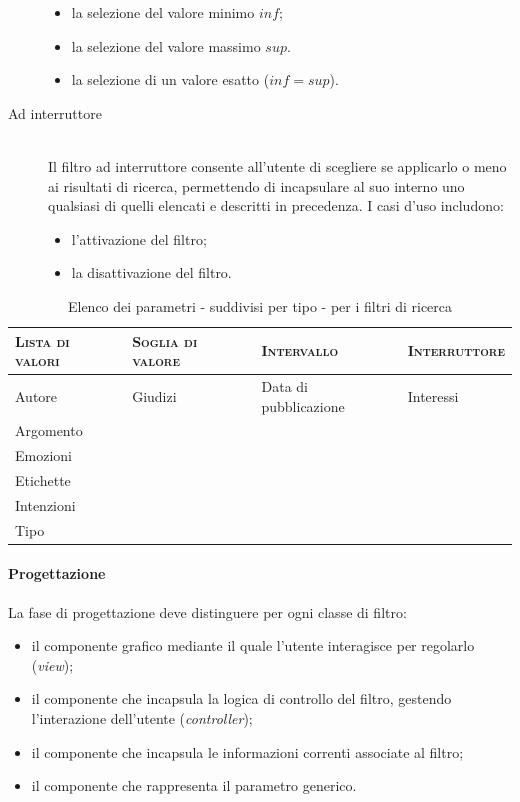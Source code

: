 \begin{description}
	\begin{itemize}
		\item la selezione del valore minimo $inf$;
		\item la selezione del valore massimo $sup$.
		\item la selezione di un valore esatto ($inf = sup$).
	\end{itemize}
	\item[Ad interruttore] \hfill \\
	Il filtro ad interruttore consente all'utente di scegliere se applicarlo o meno ai risultati di ricerca, permettendo di incapsulare al suo interno uno qualsiasi di quelli elencati e descritti in precedenza. I casi d'uso includono:
	\begin{itemize}
		\item l'attivazione del filtro;
		\item la disattivazione del filtro.
	\end{itemize}
\end{description}

\begin{table}[ht]
\centering
\begin{tabular}{|l|l|l|l|}
\hline
\textsc{Lista di valori} & \textsc{Soglia di valore} & \textsc{Intervallo} & \textsc{Interruttore}\\ \hline
Autore & Giudizi & Data di pubblicazione & Interessi \\
Argomento & & & \\
Emozioni & & & \\
Etichette & & & \\
Intenzioni & & & \\
Tipo & & & \\ \hline
\end{tabular}
\caption{Elenco dei parametri - suddivisi per tipo - per i filtri di ricerca}
\label{tab:tesi:stage:parametri-filtri-tipo}
\end{table}

\paragraph{Progettazione} La fase di progettazione deve distinguere per ogni classe di filtro:
\begin{itemize}
\item il componente grafico mediante il quale l'utente interagisce per regolarlo (\textit{view});
\item il componente che incapsula la logica di controllo del filtro, gestendo l'interazione dell'utente (\textit{controller});
\item il componente che incapsula le informazioni correnti associate al filtro;
\item il componente che rappresenta il parametro generico.
\end{itemize} 

